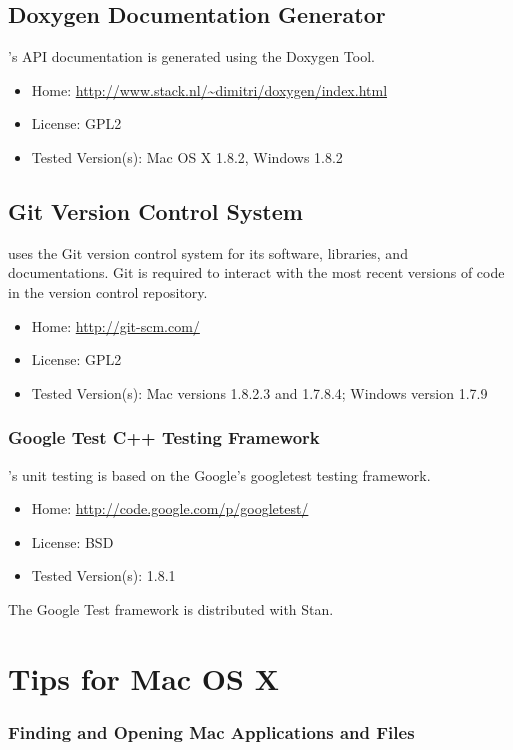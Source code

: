 \subsection{Doxygen Documentation Generator}

\CmdStan's API documentation is generated using the Doxygen Tool.
%
\begin{itemize}
\item Home: \url{http://www.stack.nl/~dimitri/doxygen/index.html}
\item License: GPL2
\item Tested Version(s): Mac OS X 1.8.2, Windows 1.8.2
\end{itemize}


\subsection{Git Version Control System}

\CmdStan uses the Git version control system for its software, libraries,
and documentations.  Git is required to interact with the most recent
versions of code in the version control repository.
%
\begin{itemize}
\item Home: \url{http://git-scm.com/}
\item License: GPL2
\item Tested Version(s): Mac versions 1.8.2.3 and 1.7.8.4; Windows version 1.7.9
\end{itemize}


\subsubsection{Google Test C++ Testing Framework}

\CmdStan's unit testing is based on the Google's googletest \Cpp testing
framework.
%
\begin{itemize}
\item
Home: \url{http://code.google.com/p/googletest/}
\item
License: BSD
\item
Tested Version(s): 1.8.1
\end{itemize}
%
The Google Test framework is distributed with Stan.


\section{Tips for Mac OS X}

\subsubsection{Finding and Opening Mac Applications and Files}

